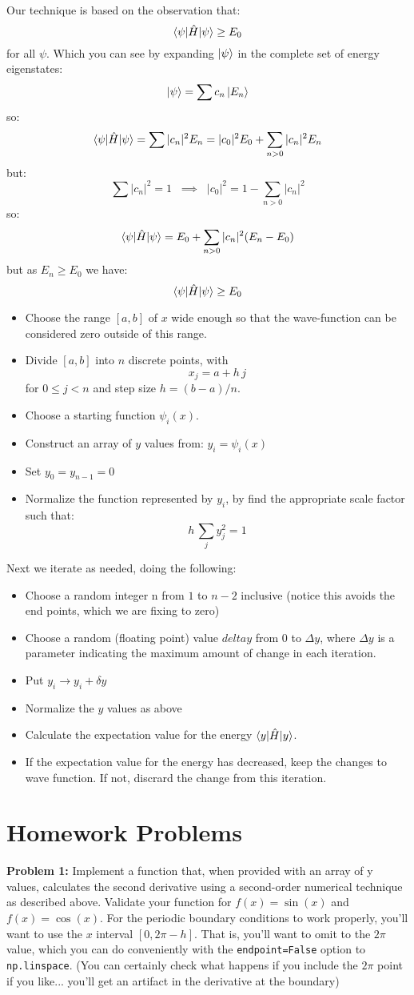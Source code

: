 \documentclass[12pt]{book}
\begin{document}
Our technique is based on the observation that:
$$\braket{\psi|\hat{H}|\psi} \geq E_0$$
for all $\psi$.  Which you can see by expanding $\ket{\psi}$ in the complete set of energy eigenstates:
$$\ket{\psi} = \sum c_n \ket{E_n}$$
so:
$$\braket{\psi|\hat{H}|\psi} = \sum |c_n|^2 E_n = |c_0|^2 E_0 + \sum_{n>0} |c_n|^2 E_n$$
but:
$$\sum |c_n|^2 = 1 \;\; \implies \;\; |c_0|^2 = 1 - \sum_{n>0} |c_n|^2$$
so:
$$\braket{\psi|\hat{H}|\psi} = E_0 + \sum_{n>0} |c_n|^2 (E_n - E_0)$$
but as $E_n \geq E_0$ we have:
$$\braket{\psi|\hat{H}|\psi} \geq E_0$$

\begin{itemize}
\item Choose the range $[a,b]$ of $x$ wide enough so that the wave-function can be considered zero outside of this range.
\item Divide $[a,b]$ into $n$ discrete points, with
$$x_j = a + h\,j$$
for $0 \leq j < n$ and step size $h = (b-a)/n$.
\item Choose a starting function $\psi_i(x)$.
\item Construct an array of $y$ values from:
  $y_i = \psi_i(x)$
\item Set $y_0 = y_{n-1} = 0$
\item Normalize the function represented by $y_i$, by find the appropriate scale factor such that:
$$h \, \sum_j y_j^2 = 1$$
\end{itemize}
Next we iterate as needed, doing the following:
\begin{itemize}
\item Choose a random integer n from $1$ to $n-2$ inclusive (notice this avoids the end points, which we are fixing to zero)
\item Choose a random (floating point) value $delta y$ from 0 to $\Delta y$, where $\Delta y$ is a parameter indicating the maximum amount of change in each iteration.
\item Put $y_i \to y_i + \delta y$
\item Normalize the $y$ values as above
\item Calculate the expectation value for the energy $\braket{y|\hat{H}|y}$.
\item If the expectation value for the energy has decreased, keep the changes to wave function.  If not, discrard the change from this iteration.
\end{itemize}  

\section{Homework Problems}

\noindent
{\bf Problem 1:}  Implement a function that, when provided with an array of y values, calculates the second derivative using a second-order numerical technique as described above.  Validate your function for $f(x) = \sin(x)$ and $f(x) = \cos(x)$.  For the periodic boundary conditions to work properly, you'll want to use the $x$ interval $[0, 2\pi-h]$.  That is, you'll want to omit to the $2\pi$ value, which you can do conveniently with the {\tt endpoint=False} option to {\tt np.linspace}.  (You can certainly check what happens if you include the $2\pi$ point if you like... you'll get an artifact in the derivative at the boundary)
\end{document}
